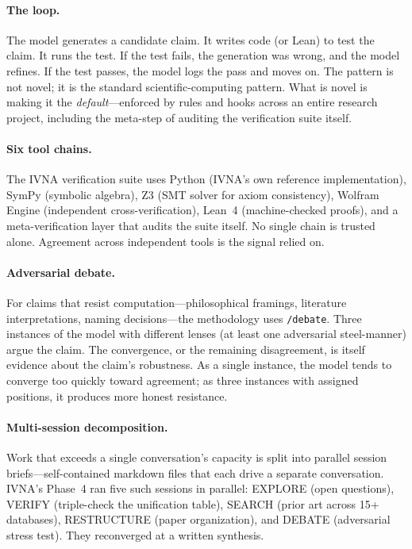 \documentclass[12pt]{article}
\begin{document}
\paragraph{The loop.} The model generates a candidate claim. It writes code (or Lean) to test the claim. It runs the test. If the test fails, the generation was wrong, and the model refines. If the test passes, the model logs the pass and moves on. The pattern is not novel; it is the standard scientific-computing pattern. What is novel is making it the \emph{default}---enforced by rules and hooks across an entire research project, including the meta-step of auditing the verification suite itself.

\paragraph{Six tool chains.} The IVNA verification suite uses Python (IVNA's own reference implementation), SymPy (symbolic algebra), Z3 (SMT solver for axiom consistency), Wolfram Engine (independent cross-verification), Lean~4 (machine-checked proofs), and a meta-verification layer that audits the suite itself. No single chain is trusted alone. Agreement across independent tools is the signal relied on.

\paragraph{Adversarial debate.} For claims that resist computation---philosophical framings, literature interpretations, naming decisions---the methodology uses \texttt{/debate}. Three instances of the model with different lenses (at least one adversarial steel-manner) argue the claim. The convergence, or the remaining disagreement, is itself evidence about the claim's robustness. As a single instance, the model tends to converge too quickly toward agreement; as three instances with assigned positions, it produces more honest resistance.

\paragraph{Multi-session decomposition.} Work that exceeds a single conversation's capacity is split into parallel session briefs---self-contained markdown files that each drive a separate conversation. IVNA's Phase~4 ran five such sessions in parallel: EXPLORE (open questions), VERIFY (triple-check the unification table), SEARCH (prior art across 15+ databases), RESTRUCTURE (paper organization), and DEBATE (adversarial stress test). They reconverged at a written synthesis.
\end{document}
